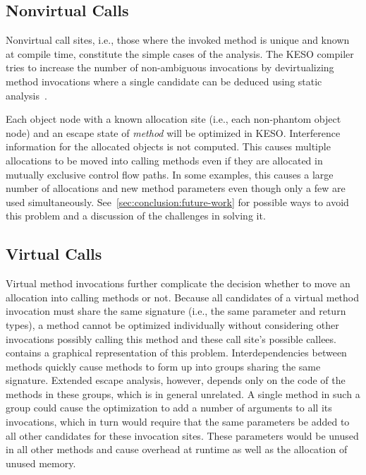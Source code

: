 
		\subsection{Nonvirtual Calls}
			\label{sub:eea:analysis:nonvirtual}
			Nonvirtual call sites, i.e., those where the invoked method is unique and known at compile time, constitute the
			simple cases of the analysis. The KESO compiler tries to increase the number of non-ambiguous invocations by
			devirtualizing method invocations where a single candidate can be deduced using static
			analysis~\cite[Sec.~3.4]{erhardt:11:jtres}.

			Each object node with a known allocation site (i.e., each non-phantom object node) and an escape state of
			\emph{method} will be optimized in KESO\@. Interference information for the allocated objects is not computed.
			This causes multiple allocations to be moved into calling methods even if they are allocated in mutually exclusive
			control flow paths. In some examples, this causes a large number of allocations and new method parameters even
			though only a few are used simultaneously. See~\cref{sec:conclusion:future-work} for possible ways to avoid this
			problem and a discussion of the challenges in solving it.

		\subsection{Virtual Calls}
			\label{sub:eea:analysis:virtual}
			Virtual method invocations further complicate the decision whether to move an allocation into calling methods or
			not. Because all candidates of a virtual method invocation must share the same signature (i.e., the same parameter
			and return types), a method cannot be optimized individually without considering other invocations possibly
			calling this method and these call site's possible callees.  contains a graphical
			representation of this problem. Interdependencies between methods quickly cause methods to form up into groups
			sharing the same signature. Extended escape analysis, however, depends only on the code of the methods in these
			groups, which is in general unrelated. A single method in such a group could cause the optimization to add
			a number of arguments to all its invocations, which in turn would require that the same parameters be added to all
			other candidates for these invocation sites. These parameters would be unused in all other methods and cause
			overhead at runtime as well as the allocation of unused memory.

